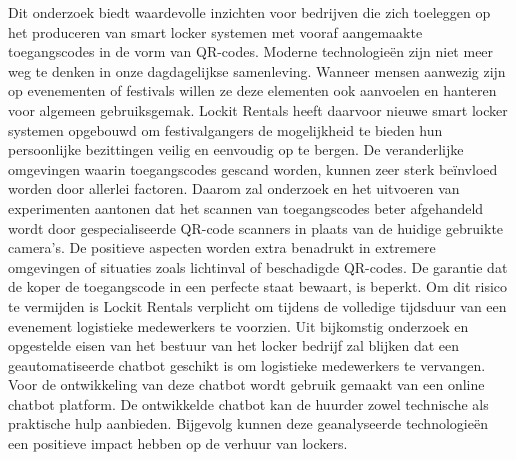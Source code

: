 Dit onderzoek biedt waardevolle inzichten voor bedrijven die zich toeleggen op het produceren van smart locker systemen met vooraf aangemaakte toegangscodes in de vorm van QR-codes. Moderne technologieën zijn niet meer weg te denken in onze dagdagelijkse samenleving. Wanneer mensen aanwezig zijn op evenementen of festivals willen ze deze elementen ook aanvoelen en hanteren voor algemeen gebruiksgemak. Lockit Rentals heeft daarvoor nieuwe smart locker systemen opgebouwd om festivalgangers de mogelijkheid te bieden hun persoonlijke bezittingen veilig en eenvoudig op te bergen. De veranderlijke omgevingen waarin toegangscodes gescand worden, kunnen zeer sterk beïnvloed worden door allerlei factoren. Daarom zal onderzoek en het uitvoeren van experimenten aantonen dat het scannen van toegangscodes beter afgehandeld wordt door gespecialiseerde QR-code scanners in plaats van de huidige gebruikte camera’s. De positieve aspecten worden extra benadrukt in extremere omgevingen of situaties zoals lichtinval of beschadigde QR-codes. De garantie dat de koper de toegangscode in een perfecte staat bewaart, is beperkt. Om dit risico te vermijden is Lockit Rentals verplicht om tijdens de volledige tijdsduur van een evenement logistieke medewerkers te voorzien. Uit bijkomstig onderzoek en opgestelde eisen van het bestuur van het locker bedrijf zal blijken dat een geautomatiseerde chatbot geschikt is om logistieke medewerkers te vervangen. Voor de ontwikkeling van deze chatbot wordt gebruik gemaakt van een online chatbot platform. De ontwikkelde chatbot kan de huurder zowel technische als praktische hulp aanbieden. Bijgevolg kunnen deze geanalyseerde technologieën een positieve impact hebben op de verhuur van lockers. 

